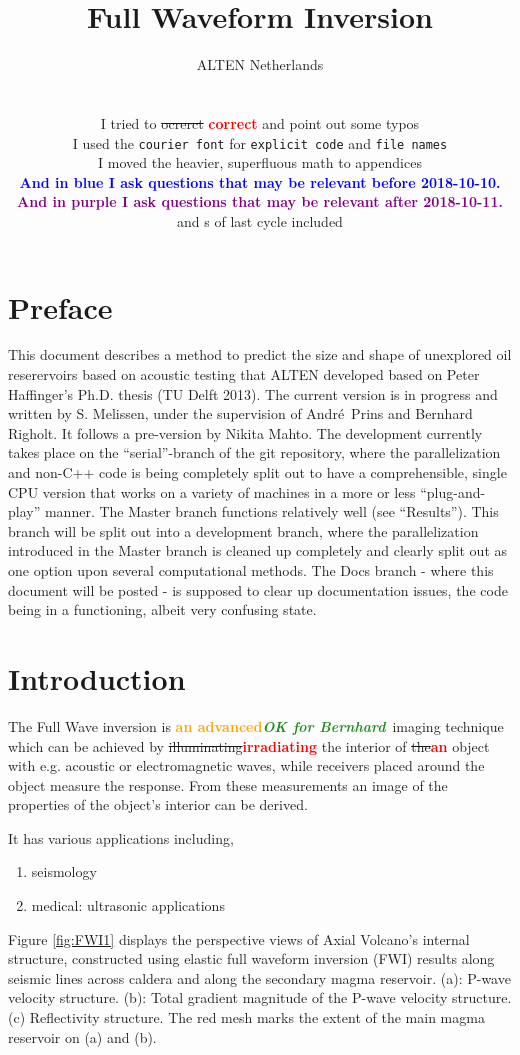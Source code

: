 \documentclass[10pt,a4paper]{article}
\title{Full Waveform Inversion}
\author{ALTEN Netherlands\\
\newstm{This version is annotated by S MELISSEN, in red before 2018-10-10}\\
\newstmtwo{This version is annotated by S MELISSEN, in orange after
2018-10-11}\\
I tried to \sout{ocrerct} \textcolor{red}{\textbf{correct}} and point
out some typos\\
I used the \texttt{courier font} for \texttt{explicit code} and
\texttt{file names}\\
I moved the heavier, superfluous math to appendices\\
\textcolor{blue}{\textbf{And in blue I ask questions that may be
relevant before 2018-10-10.}}\\
\textcolor{purple}{\textbf{And in purple I ask questions that may be
relevant after 2018-10-11.}}\\
{\brok} and {\brnok}s of last cycle included}
\newcommand{\newstm}[1]{\textcolor{red}{\textbf{#1}}}
\newcommand{\newstmtwo}[1]{\textcolor{orange}{\textbf{#1}}}
\newcommand{\oldstm}[1]{\sout{#1}}
\newcommand{\brok}{\textcolor{ForestGreen}{\textit{\textbf{OK for Bernhard}}}}
\begin{document}
\maketitle
\newpage
\tableofcontents
\newpage
\section{Preface}
This document describes a method to predict the size and shape of unexplored oil reserervoirs based on acoustic testing that ALTEN developed based on Peter Haffinger's Ph.D. thesis (TU Delft 2013).
The current version is in progress and written by S. Melissen, under the supervision of Andr\'e\ Prins and Bernhard Righolt.
It follows a pre-version by Nikita Mahto.
The development currently takes place on the ``serial''-branch of the git repository, where the parallelization and non-C++ code is being completely split out to have a comprehensible, single CPU version that works on a variety of machines in a more or less ``plug-and-play'' manner.
The Master branch functions relatively well (see ``Results'').
This branch will be split out into a development branch, where the parallelization introduced in the Master branch is cleaned up completely and clearly split out as one option upon several computational methods.
The Docs branch - where this document will be posted - is supposed to clear up documentation issues, the code being in a functioning, albeit very confusing state.

\newpage
\clearpage
\section{Introduction}

The Full Wave inversion is \newstmtwo{an advanced}\brok\ imaging
technique which can be achieved by
\oldstm{illuminating}\newstm{irradiating} the interior of
\oldstm{the}\newstm{an} object with e.g. acoustic or electromagnetic
waves, while receivers placed around the object measure the response.
From these measurements an image of the properties of the object's
interior can be derived.

It has various applications including,

\begin{enumerate}
    \item seismology
    \item medical: ultrasonic applications
\end{enumerate}

Figure \ref{fig:FWI1} displays the perspective views of Axial
Volcano’s internal structure, constructed using elastic full waveform
inversion (FWI) results along seismic lines across caldera and along
the secondary magma reservoir. (a): P-wave velocity structure. (b):
Total gradient magnitude of the P-wave velocity structure. (c)
Reflectivity structure. The red mesh marks the extent of the main
magma reservoir on (a) and (b).
\end{document}
